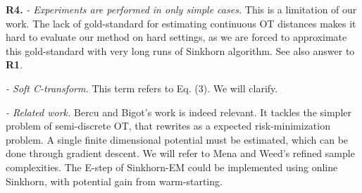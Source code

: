 \documentclass{article}
\begin{document}
\textbf{R4.} \textit{- Experiments are performed in only simple cases.} This is a limitation of our work. The lack of gold-standard for estimating continuous OT distances makes it hard to evaluate our method on hard settings, as we are forced to approximate this gold-standard with very long runs of Sinkhorn algorithm. See also answer to \textbf{R1}.

\textit{- Soft C-transform.} This term refers to Eq. (3). We will clarify.

\textit{- Related work.} Bercu and Bigot's work is indeed relevant. It tackles the simpler problem of semi-discrete OT, that rewrites as a expected risk-minimization problem. A single finite dimensional potential must be estimated, which can be done through gradient descent. We will refer to Mena and Weed's refined sample complexities. The E-step of Sinkhorn-EM could be implemented using online Sinkhorn, with potential gain from warm-starting.
\end{document}
